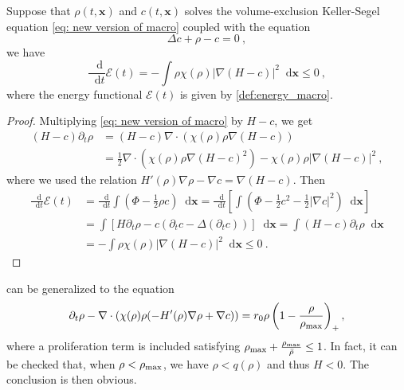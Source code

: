 \documentclass[review,onefignum,onetabnum]{siamart220329}
\newcommand {\bx} { {\mathbf{x}} }
\newcommand*\diff{\mathop{}\!\mathrm{d}}
\begin{document}
\begin{proposition}\label{prop:energy}
Suppose that $\rho(t,\mathbf{x})$ and $c(t,\mathbf{x})$ solves the volume-exclusion Keller-Segel equation \cref{eq: new version of macro} coupled with the equation
\begin{equation}\label{elliptic_c}
   \Delta c + \rho - c = 0\ , 
\end{equation}
we have
\begin{equation}
    \frac{\diff}{\diff t}\mathcal{E}(t)=-\int \rho\chi(\rho)|\nabla(H-c)|^2\diff \bx\leq 0\ ,
\end{equation}
where the energy functional $\mathcal{E}(t)$ is given by \cref{def:energy_macro}.
\end{proposition}


 
\begin{proof}
 Multiplying \cref{eq: new version of macro} by $H- c$, we get
\begin{align}
    (H-c)\partial_t\rho & =(H-c)\nabla\cdot(\chi(\rho)\rho\nabla(H-c))\nonumber\\ & = \frac{1}{2}\nabla\cdot\left( \chi(\rho)\rho\nabla(H-c)^2\right)-\chi(\rho)\rho|\nabla(H-c)|^2 \ ,\nonumber
\end{align}
where we used the relation $H'(\rho)\nabla\rho-\nabla c=\nabla(H-c)$.
Then
\begin{align*}
    \frac{\diff}{\diff t}\mathcal{E}(t) & = \frac{\diff }{\diff t}\int \left(\Phi-\frac{1}{2}\rho c \right)\diff \bx
    = \frac{\diff }{\diff t} \left[\int \left(\Phi-\frac{1}{2} c^2 -\frac{1}{2} |\nabla c|^2 \right)\diff \bx\right]\\
    & = \int\left[ H\partial_t\rho - c \left(\partial_t c - \Delta(\partial_t c)\right) \right] \diff \bx  = \int (H - c)\partial_t\rho \diff \bx \\
    &=-\int \rho\chi(\rho)|\nabla(H-c)|^2\diff \bx\leq 0\ .
\end{align*}
\end{proof}
\begin{remark}\label{rem 6}
 can be generalized to the equation 
\begin{equation*}
    \partial_t\rho-\nabla\cdot(\chi(\rho)\rho(-H'(\rho)\nabla\rho+\nabla c))=r_0\rho\left(1 - \frac{\rho}{\rho_{\rm max}}\right)_+,
\end{equation*}
where a proliferation term is included satisfying $\rho_{\rm max} + \frac{\rho_{\rm max}}{\bar{\rho}} \le 1$. 
In fact, it can be checked that, when $\rho<\rho_{\rm max}$, we have $\rho < q(\rho)$ and thus $H<0$. 
The conclusion is then obvious. 
\end{remark}
\end{document}
